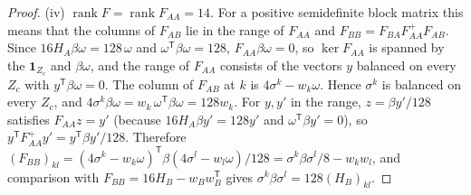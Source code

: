 \documentclass[11pt]{article}
\theoremstyle{definition}
\begin{document}
\begin{proof}
(iv) $\operatorname{rank}F=\operatorname{rank}F_{AA}=14$. For a positive semidefinite block matrix this
means that the columns of $F_{AB}$ lie in the range of $F_{AA}$ and $F_{BB}=F_{BA}F_{AA}^+F_{AB}$. Since
$16H_A\beta\omega=128\,\omega$ and $\omega^{\mathsf T}\beta\omega=128$, $F_{AA}\beta\omega=0$, so
$\ker F_{AA}$ is spanned by the $\mathbf 1_{Z_c}$ and $\beta\omega$, and the range of $F_{AA}$ consists of the
vectors $y$ balanced on every $Z_c$ with $y^{\mathsf T}\beta\omega=0$. The column of $F_{AB}$ at $k$ is
$4\sigma^k-w_k\omega$. Hence $\sigma^k$ is balanced on every $Z_c$, and $4\sigma^k\beta\omega=w_k\,\omega^{\mathsf
T}\beta\omega=128w_k$. For $y,y'$ in the range, $z=\beta y'/128$ satisfies $F_{AA}z=y'$ (because $16H_A\beta
y'=128y'$ and $\omega^{\mathsf T}\beta y'=0$), so $y^{\mathsf T}F_{AA}^+y'=y^{\mathsf T}\beta y'/128$. Therefore
$(F_{BB})_{kl}=(4\sigma^k-w_k\omega)^{\mathsf T}\beta(4\sigma^l-w_l\omega)/128=\sigma^k\beta\sigma^l/8-w_kw_l$,
and comparison with $F_{BB}=16H_B-w_Bw_B^{\mathsf T}$ gives $\sigma^k\beta\sigma^l=128(H_B)_{kl}$.
\end{proof}
\end{document}
